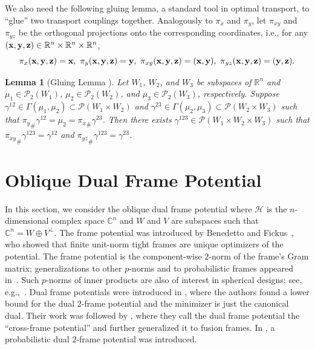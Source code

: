\documentclass{amsart}
\numberwithin{equation}{section}
\theoremstyle{plain}
\newtheorem{lemma}[theorem]{Lemma}
\theoremstyle{remark}
\theoremstyle{definition}
\begin{document}
We also need the following gluing lemma, a standard tool in optimal transport, to ``glue'' two transport couplings together. Analogously to $\pi_x$ and $\pi_y$, let $\pi_{xy}$ and $\pi_{yz}$ be the orthogonal projections onto the corresponding coordinates, i.e.,  for any $({\bf x}, {\bf y}, {\bf z}) \in \mathbb{R}^n \times \mathbb{R}^n \times \mathbb{R}^n$, 
\begin{equation*}
    \pi_x({\bf x}, {\bf y}, {\bf z}) = {\bf x}, \ \pi_y({\bf x}, {\bf y}, {\bf z}) = {\bf y}, \ \pi_{xy}({\bf x}, {\bf y}, {\bf z})=({\bf x}, {\bf y}), \ \pi_{yz}({\bf x}, {\bf y}, {\bf z})=({\bf y}, {\bf z}).
\end{equation*}

\begin{lemma}[Gluing Lemma {\cite[p.~59]{figalli2021invitation}}]\label{gluinglemma} 
Let $W_1$, $W_2$, and $W_3$ be subspaces of $\mathbb{R}^n$ and $\mu_1 \in \mathcal{P}_2(W_1)$, $\mu_2\in \mathcal{P}_2(W_2)$, and $\mu_3 \in \mathcal{P}_2(W_3)$, respectively. Suppose $\gamma^{12} \in \Gamma(\mu_1, \mu_2) \subset \mathcal{P}(W_1 \times W_2)$ and $\gamma^{23} \in \Gamma(\mu_2, \mu_3) \subset \mathcal{P}(W_2 \times W_3)$ such that ${\pi_y}_{\#}\gamma^{12} = \mu_2 = {\pi_x}_{\#}\gamma^{23}$. Then there exists $\gamma^{123} \in \mathcal{P}(W_1 \times W_2 \times W_3)$ such that ${\pi_{xy}}_{\#}\gamma^{123} = \gamma^{12}$ and ${\pi_{yz}}_{\#}\gamma^{123} = \gamma^{23}$. 
\end{lemma}





\section{Oblique Dual Frame Potential}\label{section:dualptential}
In this section, we consider the oblique dual frame potential where $\mathcal{H}$ is the $n$-dimensional complex space $\mathbb{C}^n$ and $W$ and $V$ are subspaces such that $\mathbb{C}^n = W \oplus V^\perp$. 
The frame potential was introduced by Benedetto and Fickus~\cite{benedetto2003finite}, who showed that finite unit-norm tight frames are unique optimizers of the potential. The frame potential is the component-wise $2$-norm of the frame's Gram matrix; generalizations to other $p$-norms and to probabilistic frames appeared in~\cite{ehler2012minimization}.  Such $p$-norms of inner products are also of interest in spherical designs; see, e.g.,~\cite{seidel2001definitions}. Dual frame potentials were introduced in \cite{christensen2020equiangular}, where the authors found a lower bound for the dual $2$-frame potential and the minimizer is just the canonical dual. Their work was followed by \cite{aceska2022cross}, where they call the dual frame potential the ``cross-frame potential'' and further generalized it to fusion frames. In \cite{chen2025probabilistic}, a probabilistic dual $2$-frame potential was introduced. 
\end{document}
